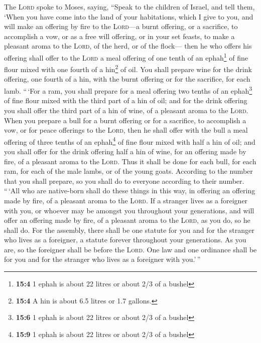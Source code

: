  The \textsc{Lord} spoke to Moses, saying, 
``Speak to the children of Israel, and tell them, `When you have come
into the land of your habitations, which I give to you, 
and will make an offering by fire to the \textsc{Lord}---a burnt
offering, or a sacrifice, to accomplish a vow, or as a free will
offering, or in your set feasts, to make a pleasant aroma to the
\textsc{Lord}, of the herd, or of the flock---  then he
who offers his offering shall offer to the \textsc{Lord} a meal offering
of one tenth of an ephah\footnote{\textbf{15:4} 1 ephah is about 22
  litres or about 2/3 of a bushel} of fine flour mixed with one fourth
of a hin\footnote{\textbf{15:4} A hin is about 6.5 litres or 1.7
  gallons.} of oil.  You shall prepare wine for the drink
offering, one fourth of a hin, with the burnt offering or for the
sacrifice, for each lamb.  ``\,`For a ram, you shall
prepare for a meal offering two tenths of an ephah\footnote{\textbf{15:6}
  1 ephah is about 22 litres or about 2/3 of a bushel} of fine flour
mixed with the third part of a hin of oil;  and for the
drink offering you shall offer the third part of a hin of wine, of a
pleasant aroma to the \textsc{Lord}.  When you prepare a
bull for a burnt offering or for a sacrifice, to accomplish a vow, or
for peace offerings to the \textsc{Lord},  then he shall
offer with the bull a meal offering of three tenths of an
ephah\footnote{\textbf{15:9} 1 ephah is about 22 litres or about 2/3 of
  a bushel} of fine flour mixed with half a hin of oil; 
and you shall offer for the drink offering half a hin of wine, for an
offering made by fire, of a pleasant aroma to the \textsc{Lord}.
 Thus it shall be done for each bull, for each ram, for
each of the male lambs, or of the young goats.  According
to the number that you shall prepare, so you shall do to everyone
according to their number.  ``\,`All who are native-born
shall do these things in this way, in offering an offering made by fire,
of a pleasant aroma to the \textsc{Lord}.  If a stranger
lives as a foreigner with you, or whoever may be amongst you throughout
your generations, and will offer an offering made by fire, of a pleasant
aroma to the \textsc{Lord}, as you do, so he shall do. 
For the assembly, there shall be one statute for you and for the
stranger who lives as a foreigner, a statute forever throughout your
generations. As you are, so the foreigner shall be before the
\textsc{Lord}.  One law and one ordinance shall be for
you and for the stranger who lives as a foreigner with you.'\,''


